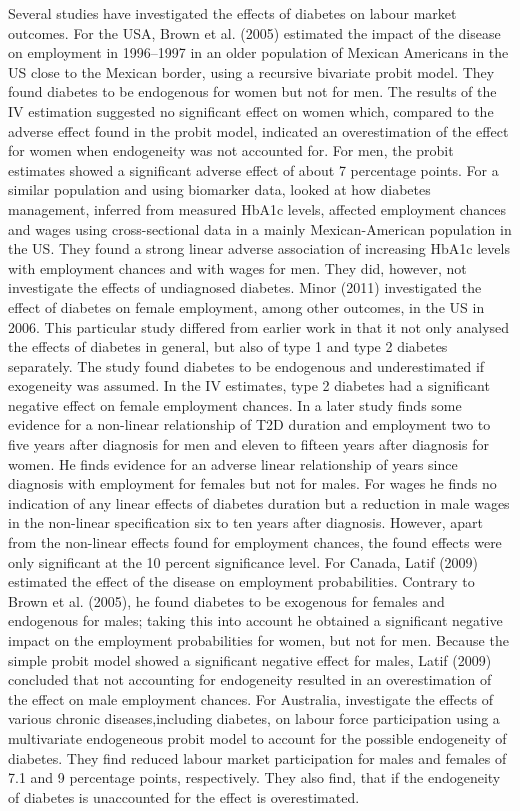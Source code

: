 Several studies have investigated the effects of diabetes on labour market outcomes. For the USA, Brown et al. (2005) estimated the impact of the disease on employment in 1996--1997 in an older population of Mexican Americans in the \ac{US} close to the Mexican border, using a recursive bivariate probit model. They found diabetes to be endogenous for women but not for men. The results of the \ac{IV} estimation suggested no significant effect on women which, compared to the adverse effect found in the probit model, indicated an overestimation of the effect for women when endogeneity was not accounted for. For men, the probit estimates showed a significant adverse effect of about 7 percentage points. For a similar population and using biomarker data,\citet{BrownIII2011} looked
at how diabetes management, inferred from measured \ac{HbA1c} levels,
affected employment chances and wages using cross-sectional data in
a mainly Mexican-American population in the US. They found a strong
linear adverse association of increasing \ac{HbA1c} levels with
employment chances and with wages for men. They did, however, not investigate the effects of undiagnosed diabetes. Minor (2011) investigated the effect of diabetes on female employment, among other outcomes, in the \ac{US} in 2006. This particular study differed from earlier work in that it not only analysed the effects of diabetes in general, but also of type 1 and type 2 diabetes separately. The study found diabetes to be endogenous and underestimated if exogeneity was assumed. In the \ac{IV} estimates, type 2 diabetes had a significant negative effect on female employment chances. In a later study \citet{Minor2013}
finds some evidence for a non-linear relationship of \ac{T2D} duration
and employment two to five years after diagnosis for men and eleven
to fifteen years after diagnosis for women. He finds evidence for
an adverse linear relationship of years since diagnosis with employment
for females but not for males. For wages he finds no indication of
any linear effects of diabetes duration but a reduction in male wages
in the non-linear specification six to ten years after diagnosis.
However, apart from the non-linear effects found for employment chances,
the found effects were only significant at the 10 percent significance
level. For Canada, Latif (2009) estimated the effect of the disease on employment probabilities. Contrary to Brown et al. (2005), he found diabetes to be exogenous for females and endogenous for males; taking this into account he obtained a significant negative impact on the employment probabilities for women, but not for men. Because the simple probit model showed a significant negative effect for males, Latif (2009) concluded that not accounting for 
endogeneity resulted in an overestimation of the effect on male employment chances. For Australia, \cite{Zhang_2009} investigate the effects of various chronic diseases,including diabetes, on labour force participation using a multivariate endogeneous probit model to account for the possible endogeneity of diabetes. They find reduced labour market participation for males and females of 7.1 and 9 percentage points, respectively. They also find, that if the endogeneity of diabetes is unaccounted for the effect is overestimated. 

